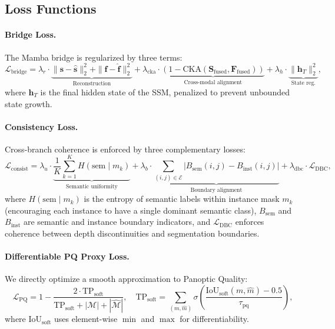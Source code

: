 \documentclass{article}
\newcommand{\lbridge}{\mathcal{L}_{\text{bridge}}}
\newcommand{\lconsist}{\mathcal{L}_{\text{consist}}}
\newcommand{\lpq}{\mathcal{L}_{\text{PQ}}}
\begin{document}
\subsection{Loss Functions}
\label{sec:losses}

\paragraph{Bridge Loss.}
The Mamba bridge is regularized by three terms:
\begin{equation}
\lbridge = \lambda_r \cdot \underbrace{\|\mathbf{s} - \hat{\mathbf{s}}\|_2^2 + \|\mathbf{f} - \hat{\mathbf{f}}\|_2^2}_{\text{Reconstruction}} + \lambda_{\text{cka}} \cdot \underbrace{(1 - \text{CKA}(\mathbf{S}_{\text{fused}}, \mathbf{F}_{\text{fused}}))}_{\text{Cross-modal alignment}} + \lambda_h \cdot \underbrace{\|\mathbf{h}_T\|_2^2}_{\text{State reg.}},
\label{eq:bridge_loss}
\end{equation}
where $\mathbf{h}_T$ is the final hidden state of the SSM, penalized to prevent unbounded state growth.

\paragraph{Consistency Loss.}
Cross-branch coherence is enforced by three complementary losses:
\begin{equation}
\lconsist = \lambda_u \cdot \underbrace{\frac{1}{K}\sum_{k=1}^{K} H(\text{sem} \mid m_k)}_{\text{Semantic uniformity}} + \lambda_b \cdot \underbrace{\sum_{(i,j) \in \mathcal{E}} |B_{\text{sem}}(i,j) - B_{\text{inst}}(i,j)|}_{\text{Boundary alignment}} + \lambda_{\text{dbc}} \cdot \mathcal{L}_{\text{DBC}},
\label{eq:consistency_loss}
\end{equation}
where $H(\text{sem} \mid m_k)$ is the entropy of semantic labels within instance mask $m_k$ (encouraging each instance to have a single dominant semantic class), $B_{\text{sem}}$ and $B_{\text{inst}}$ are semantic and instance boundary indicators, and $\mathcal{L}_{\text{DBC}}$ enforces coherence between depth discontinuities and segmentation boundaries.

\paragraph{Differentiable PQ Proxy Loss.}
We directly optimize a smooth approximation to Panoptic Quality:
\begin{equation}
\lpq = 1 - \frac{2 \cdot \text{TP}_{\text{soft}}}{\text{TP}_{\text{soft}} + |\mathcal{M}| + |\hat{\mathcal{M}}|}, \quad
\text{TP}_{\text{soft}} = \sum_{(m, \hat{m})} \sigma\!\left(\frac{\text{IoU}_{\text{soft}}(m, \hat{m}) - 0.5}{\tau_{\text{pq}}}\right),
\label{eq:pq_loss}
\end{equation}
where $\text{IoU}_{\text{soft}}$ uses element-wise $\min$ and $\max$ for differentiability.
\end{document}
